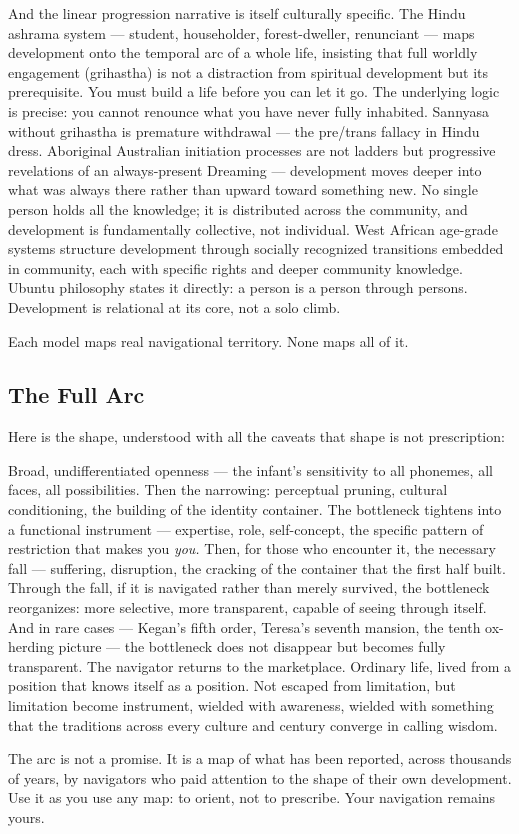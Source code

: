 And the linear progression narrative is itself culturally specific. The Hindu ashrama system — student, householder, forest-dweller, renunciant — maps development onto the temporal arc of a whole life, insisting that full worldly engagement (grihastha) is not a distraction from spiritual development but its prerequisite. You must build a life before you can let it go. The underlying logic is precise: you cannot renounce what you have never fully inhabited. Sannyasa without grihastha is premature withdrawal — the pre/\allowbreak trans fallacy in Hindu dress. Aboriginal Australian initiation processes are not ladders but progressive revelations of an always-present Dreaming — development moves deeper into what was always there rather than upward toward something new. No single person holds all the knowledge; it is distributed across the community, and development is fundamentally collective, not individual. West African age-grade systems structure development through socially recognized transitions embedded in community, each with specific rights and deeper community knowledge. Ubuntu philosophy states it directly: a person is a person through persons. Development is relational at its core, not a solo climb.


Each model maps real navigational territory. None maps all of it.


\subsection*{The Full Arc}


Here is the shape, understood with all the caveats that shape is not prescription:


Broad, undifferentiated openness — the infant's sensitivity to all phonemes, all faces, all possibilities. Then the narrowing: perceptual pruning, cultural conditioning, the building of the identity container. The bottleneck tightens into a functional instrument — expertise, role, self-concept, the specific pattern of restriction that makes you \textit{you.} Then, for those who encounter it, the necessary fall — suffering, disruption, the cracking of the container that the first half built. Through the fall, if it is navigated rather than merely survived, the bottleneck reorganizes: more selective, more transparent, capable of seeing through itself. And in rare cases — Kegan's fifth order, Teresa's seventh mansion, the tenth ox-herding picture — the bottleneck does not disappear but becomes fully transparent. The navigator returns to the marketplace. Ordinary life, lived from a position that knows itself as a position. Not escaped from limitation, but limitation become instrument, wielded with awareness, wielded with something that the traditions across every culture and century converge in calling wisdom.


The arc is not a promise. It is a map of what has been reported, across thousands of years, by navigators who paid attention to the shape of their own development. Use it as you use any map: to orient, not to prescribe. Your navigation remains yours.


\bigskip\noindent\makebox[\textwidth]{\color{rulegray}\rule{5cm}{0.3pt}}\bigskip
